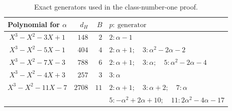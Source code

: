 \documentclass[11pt,a4paper]{article}
\theoremstyle{definition}
\theoremstyle{remark}
\numberwithin{equation}{section}
\begin{document}
\begin{table}[htbp]
\centering
\small
\begin{tabular}{c|r|r|l}
 Polynomial for $\alpha$ & $d_H$ & $B$ & $p:\ \text{generator}$\\\hline
 $X^3-X^2-3X+1$ & $148$ & $2$ & $2:\alpha-1$\\
 $X^3-X^2-5X-1$ & $404$ & $4$ &
       $2:\alpha+1;\quad3:\alpha^2-2\alpha-2$\\
 $X^3-X^2-7X-3$ & $788$ & $6$ &
       $2:\alpha+1;\quad3:\alpha;\quad5:\alpha^2-2\alpha-4$\\
 $X^3-X^2-4X+3$ & $257$ & $3$ & $3:\alpha$\\
 $X^3-X^2-11X-7$ & $2708$ & $11$ &
       $2:\alpha+1;\quad3:\alpha+2;\quad7:\alpha$\\
 & & & $5:-\alpha^2+2\alpha+10;\quad11:2\alpha^2-4\alpha-17$
\end{tabular}
\caption{Exact generators used in the class-number-one proof.}
\label{corr:classnumber-table}
\end{table}
\end{document}
